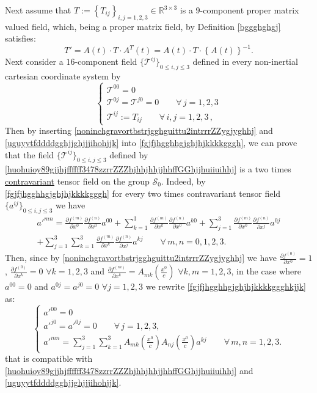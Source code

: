 \documentclass{article}
\theoremstyle{definition}
\theoremstyle{remark}
\newcommand{\R}{\mathbb{R}}
\newcommand{\er}{\eqref}
\newcommand{\R}{{\mathbb{R}}}
\newcommand{\er}{\eqref}
\begin{document}
Next assume that $T:=\left\{T_{ij}\right\}_{i,j=1,2,3}\in
\R^{3\times 3}$ is a $9$-component proper matrix valued field,
which, being a proper matrix field, by Definition \ref{bggghghgj}
satisfies:
\begin{equation}\label{uguyytfddddgghjjghjjjihohjjk}
T'=A(t)\cdot T\cdot A^T(t)=A(t)\cdot T\cdot
\left\{A(t)\right\}^{-1}.
\end{equation}
Next consider a $16$-component field $\{\mathcal{T}^{ij}\}_{0\leq
i,j\leq 3}$ defined in every non-inertial cartesian coordinate
system by
\begin{equation}\label{huohuioy89gjjhjffffff3478zzrrZZZhjhhjhhjjhhffGGhjjhuiiuihhj}
\begin{cases}
\mathcal{T}^{00}=0
\\
\mathcal{T}^{0j}=\mathcal{T}^{j0}=0\quad\quad\forall\, j=1,2,3
\\
\mathcal{T}^{ij}:=T_{ij}\quad\quad\forall\, i,j=1,2,3\,,
\end{cases}
\end{equation}
Then by inserting \er{noninchgravortbstrjgghguittu2intrrrZZygjyghhj}
and \er{uguyytfddddgghjjghjjjihohjjk} into
\er{fgjfjhgghhgjghjhjkkkkgggh}, we can prove that the field
$\{\mathcal{T}^{ij}\}_{0\leq i,j\leq 3}$ defined by
\er{huohuioy89gjjhjffffff3478zzrrZZZhjhhjhhjjhhffGGhjjhuiiuihhj} is
a two times \underline{contravariant} tensor field on the group
$\mathcal{S}_0$. Indeed, by \er{fgjfjhgghhgjghjhjkkkkgggh} for every
two times contravariant tensor field $\{a^{ij}\}_{0\leq i,j\leq 3}$
we have
\begin{multline}\label{fgjfjhgghhgjghjhjkkkkggghkjjk}
a'^{mn}=\frac{\partial f^{(m)}}{\partial x^0}\frac{\partial
f^{(n)}}{\partial x^0}a^{00}+\sum_{k=1}^{3}\frac{\partial
f^{(m)}}{\partial x^k}\frac{\partial f^{(n)}}{\partial
x^0}a^{k0}+\sum_{j=1}^{3}\frac{\partial f^{(m)}}{\partial
x^0}\frac{\partial f^{(n)}}{\partial
x^j}a^{0j}\\+\sum_{j=1}^{3}\sum_{k=1}^{3}\frac{\partial
f^{(m)}}{\partial x^k}\frac{\partial f^{(n)}}{\partial
x^j}a^{kj}\quad\quad\forall\, m,n=0,1,2,3.
\end{multline}
Then, since by \er{noninchgravortbstrjgghguittu2intrrrZZygjyghhj} we
have $\frac{\partial f^{(0)}}{\partial x^0}=1$, $\frac{\partial
f^{(0)}}{\partial x^k}=0$ $\forall k=1,2,3$ and $\frac{\partial
f^{(m)}}{\partial x^k}=A_{mk}\left(\frac{x^0}{c}\right)$ $\forall
k,m=1,2,3$, in the case where $a^{00}=0$ and $a^{0j}=a^{j0}=0$
$\forall j=1,2,3$  we rewrite \er{fgjfjhgghhgjghjhjkkkkggghkjjk} as:
\begin{equation}\label{fgjfjhgghhgjghjhjkkkkggghjjkjhgj}
\begin{cases}
a'^{00}=0\\
a'^{j0}=a'^{0j}=0\quad\quad\forall\, j=1,2,3,
\\
a'^{mn}=\sum_{j=1}^{3}\sum_{k=1}^{3}A_{mk}\left(\frac{x^0}{c}\right)A_{nj}\left(\frac{x^0}{c}\right)a^{kj}\quad\quad\forall\,
m,n=1,2,3.
\end{cases}
\end{equation}
that is compatible with
\er{huohuioy89gjjhjffffff3478zzrrZZZhjhhjhhjjhhffGGhjjhuiiuihhj} and
\er{uguyytfddddgghjjghjjjihohjjk}.
\end{document}

